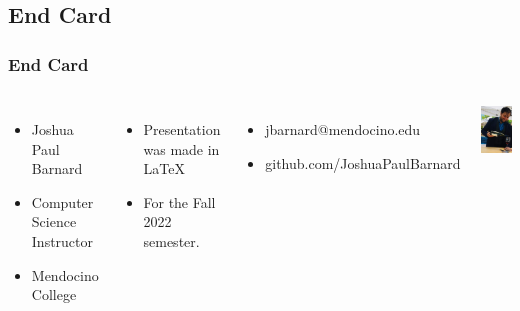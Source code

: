 \documentclass{beamer}
\begin{document}
		\subsection{End Card}
		\begin{frame}
			\frametitle{End Card}	
			\begin{columns}
				\vspace{-25pt}
				\begin{itemize}
					\item Joshua Paul Barnard
					\item Computer Science Instructor
					\item Mendocino College
				\end{itemize}
			\space
				\begin{itemize}
					\item Presentation was made in \LaTeX
					\item For the Fall 2022 semester.  
				\end{itemize}
				\begin{itemize}
					\item jbarnard@mendocino.edu
					\item github.com/JoshuaPaulBarnard
				\end{itemize}
				\includegraphics[width=.85\textwidth]{images/shone farm wine pouring - vert.png}
			\end{columns}
		\end{frame}
	
\end{document}
